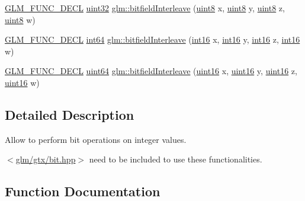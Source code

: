 \begin{DoxyCompactItemize}
\item 
\hyperlink{setup_8hpp_ab2d052de21a70539923e9bcbf6e83a51}{G\+L\+M\+\_\+\+F\+U\+N\+C\+\_\+\+D\+E\+CL} \hyperlink{group__gtc__type__precision_ga202b6a53c105fcb7e531f9b443518451}{uint32} \hyperlink{group__gtx__bit_ga447c0bbed9d60c14578626d8f03f3755}{glm\+::bitfield\+Interleave} (\hyperlink{group__gtc__type__precision_ga1a7dcd8aac97cc8020817c94049deff2}{uint8} x, \hyperlink{group__gtc__type__precision_ga1a7dcd8aac97cc8020817c94049deff2}{uint8} y, \hyperlink{group__gtc__type__precision_ga1a7dcd8aac97cc8020817c94049deff2}{uint8} z, \hyperlink{group__gtc__type__precision_ga1a7dcd8aac97cc8020817c94049deff2}{uint8} w)
\item 
\hyperlink{setup_8hpp_ab2d052de21a70539923e9bcbf6e83a51}{G\+L\+M\+\_\+\+F\+U\+N\+C\+\_\+\+D\+E\+CL} \hyperlink{group__gtc__type__precision_ga435d75819cce297cc5fa21bd84ef89a5}{int64} \hyperlink{group__gtx__bit_ga09ee0be0fac790a1607a711e597dd9bf}{glm\+::bitfield\+Interleave} (\hyperlink{group__gtc__type__precision_ga2945a61d12771f8954994fcddf02b021}{int16} x, \hyperlink{group__gtc__type__precision_ga2945a61d12771f8954994fcddf02b021}{int16} y, \hyperlink{group__gtc__type__precision_ga2945a61d12771f8954994fcddf02b021}{int16} z, \hyperlink{group__gtc__type__precision_ga2945a61d12771f8954994fcddf02b021}{int16} w)
\item 
\hyperlink{setup_8hpp_ab2d052de21a70539923e9bcbf6e83a51}{G\+L\+M\+\_\+\+F\+U\+N\+C\+\_\+\+D\+E\+CL} \hyperlink{group__gtc__type__precision_gae3632bf9b37da66233d78930dd06378a}{uint64} \hyperlink{group__gtx__bit_gac8a926a7bfd9b23c22a4f685193fbfe1}{glm\+::bitfield\+Interleave} (\hyperlink{group__gtc__type__precision_gad8c2939e1fdd8e5828b31d95c52255d5}{uint16} x, \hyperlink{group__gtc__type__precision_gad8c2939e1fdd8e5828b31d95c52255d5}{uint16} y, \hyperlink{group__gtc__type__precision_gad8c2939e1fdd8e5828b31d95c52255d5}{uint16} z, \hyperlink{group__gtc__type__precision_gad8c2939e1fdd8e5828b31d95c52255d5}{uint16} w)
\end{DoxyCompactItemize}


\subsection{Detailed Description}
Allow to perform bit operations on integer values. 

$<$\hyperlink{bit_8hpp}{glm/gtx/bit.\+hpp}$>$ need to be included to use these functionalities. 

\subsection{Function Documentation}
\mbox{\label{group__gtx__bit_ga479134317bc95d99f2b2e235d3db287b}} 
